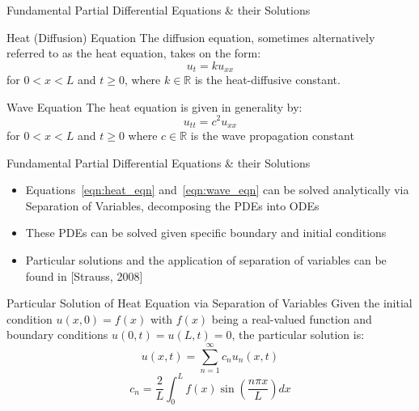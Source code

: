 \documentclass[aspectratio=169,xcolor=dvipsnames]{beamer}
\begin{document}
\begin{frame}{Fundamental Partial Differential Equations \& their Solutions}
\begin{block}{Heat (Diffusion) Equation}
The diffusion equation, sometimes alternatively referred to as the heat equation, takes on the form:
\begin{equation}
    u_{t} = ku_{xx}
    \label{eqn:heat_eqn}
\end{equation}
for $0<x<L$ and $t\geq 0$, where $k \in \mathbb{R}$ is the heat-diffusive constant.
\end{block}

\begin{block}{Wave Equation}
The heat equation is given in generality by:
\begin{equation}
    u_{tt} = c^2u_{xx}
    \label{eqn:wave_eqn}
\end{equation}
for $0<x<L$ and $t \geq 0$ where $c \in \mathbb{R}$ is the wave propagation constant
\end{block}
\end{frame}

\begin{frame}{Fundamental Partial Differential Equations \& their Solutions}
\begin{itemize}
    \item Equations~\ref{eqn:heat_eqn} and~\ref{eqn:wave_eqn} can be solved analytically via Separation of Variables, decomposing the PDEs into ODEs
    \item These PDEs can be solved given specific boundary and initial conditions
    \item Particular solutions and the application of separation of variables can be found in [Strauss, 2008]
\end{itemize}

\begin{block}{Particular Solution of Heat Equation via Separation of Variables}
Given the initial condition $u(x,0) = f(x)$ with $f(x)$ being a real-valued function and boundary conditions $u(0,t) = u(L,t) = 0$, the particular solution is:
\begin{equation}
    u(x, t) = \sum_{n=1}^{\infty} c_{n} u_{n}(x,t)
    \label{eqn:heat_general}
\end{equation}
\begin{equation}
    c_{n} = \frac{2}{L} \int_{0}^{L} f(x) \sin(\frac{n \pi x}{L})dx
    \label{eqn:heat_const}
\end{equation}
\end{block}

\end{frame}
\end{document}
